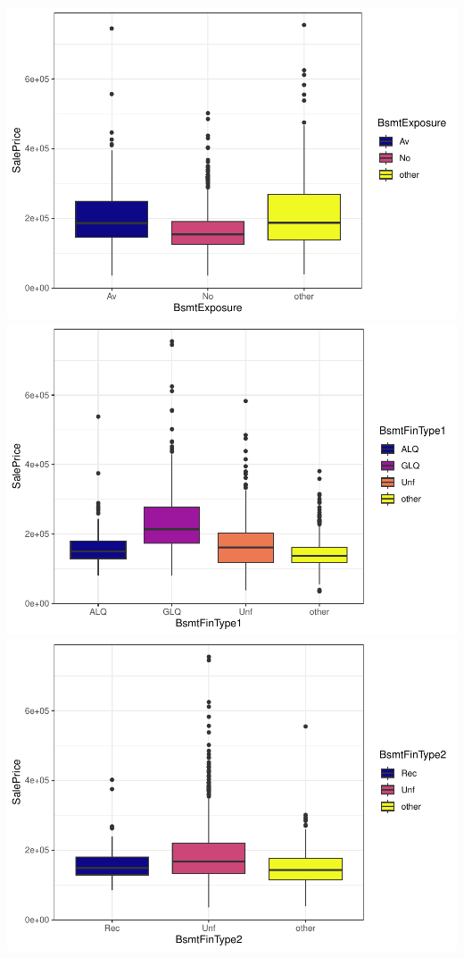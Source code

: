 \documentclass[
]{article}
\begin{document}
\includegraphics{report_files/figure-latex/categorical variables-19.pdf}
\includegraphics{report_files/figure-latex/categorical variables-20.pdf}
\includegraphics{report_files/figure-latex/categorical variables-21.pdf}
\end{document}
